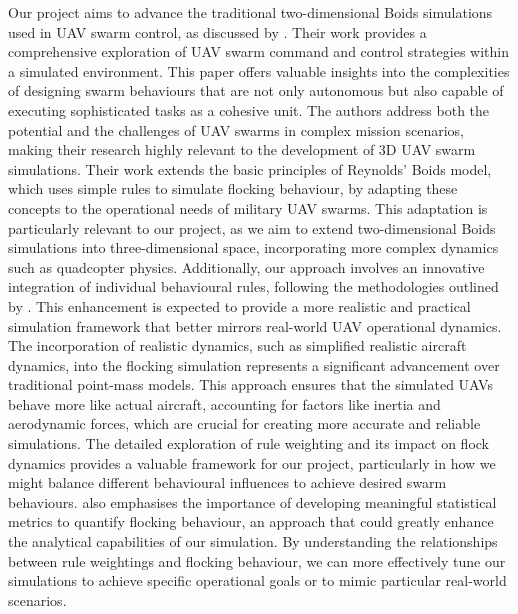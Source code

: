\documentclass[12pt]{article}
\begin{document}
Our project aims to advance the traditional two-dimensional Boids simulations used in UAV swarm control, as discussed by \citet{madey2013design}. Their work provides a comprehensive exploration of UAV swarm command and control strategies within a simulated environment. This paper offers valuable insights into the complexities of designing swarm behaviours that are not only autonomous but also capable of executing sophisticated tasks as a cohesive unit. The authors address both the potential and the challenges of UAV swarms in complex mission scenarios, making their research highly relevant to the development of 3D UAV swarm simulations. Their work extends the basic principles of Reynolds' Boids model, which uses simple rules to simulate flocking behaviour, by adapting these concepts to the operational needs of military UAV swarms. This adaptation is particularly relevant to our project, as we aim to extend two-dimensional Boids simulations into three-dimensional space, incorporating more complex dynamics such as quadcopter physics. Additionally, our approach involves an innovative integration of individual behavioural rules, following the methodologies outlined by \citet{watson}. This enhancement is expected to provide a more realistic and practical simulation framework that better mirrors real-world UAV operational dynamics. The incorporation of realistic dynamics, such as simplified realistic aircraft dynamics, into the flocking simulation represents a significant advancement over traditional point-mass models. This approach ensures that the simulated UAVs behave more like actual aircraft, accounting for factors like inertia and aerodynamic forces, which are crucial for creating more accurate and reliable simulations. The detailed exploration of rule weighting and its impact on flock dynamics provides a valuable framework for our project, particularly in how we might balance different behavioural influences to achieve desired swarm behaviours. \citet{watson} also emphasises the importance of developing meaningful statistical metrics to quantify flocking behaviour, an approach that could greatly enhance the analytical capabilities of our simulation. By understanding the relationships between rule weightings and flocking behaviour, we can more effectively tune our simulations to achieve specific operational goals or to mimic particular real-world scenarios.
\end{document}
